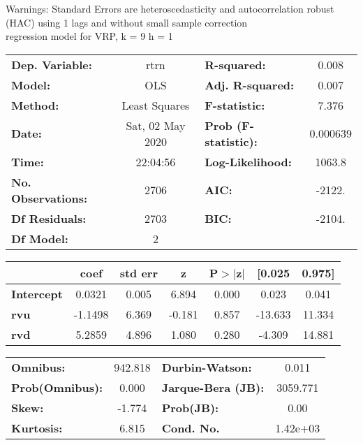 Warnings: \newline
 [1] Standard Errors are heteroscedasticity and autocorrelation robust (HAC) using 1 lags and without small sample correction\\ 

regression model for VRP, k = 9 h = 1\begin{center}
\begin{tabular}{lclc}
\toprule
\textbf{Dep. Variable:}    &       rtrn       & \textbf{  R-squared:         } &     0.008   \\
\textbf{Model:}            &       OLS        & \textbf{  Adj. R-squared:    } &     0.007   \\
\textbf{Method:}           &  Least Squares   & \textbf{  F-statistic:       } &     7.376   \\
\textbf{Date:}             & Sat, 02 May 2020 & \textbf{  Prob (F-statistic):} &  0.000639   \\
\textbf{Time:}             &     22:04:56     & \textbf{  Log-Likelihood:    } &    1063.8   \\
\textbf{No. Observations:} &        2706      & \textbf{  AIC:               } &    -2122.   \\
\textbf{Df Residuals:}     &        2703      & \textbf{  BIC:               } &    -2104.   \\
\textbf{Df Model:}         &           2      & \textbf{                     } &             \\
\bottomrule
\end{tabular}
\begin{tabular}{lcccccc}
                   & \textbf{coef} & \textbf{std err} & \textbf{z} & \textbf{P$> |$z$|$} & \textbf{[0.025} & \textbf{0.975]}  \\
\midrule
\textbf{Intercept} &       0.0321  &        0.005     &     6.894  &         0.000        &        0.023    &        0.041     \\
\textbf{rvu}       &      -1.1498  &        6.369     &    -0.181  &         0.857        &      -13.633    &       11.334     \\
\textbf{rvd}       &       5.2859  &        4.896     &     1.080  &         0.280        &       -4.309    &       14.881     \\
\bottomrule
\end{tabular}
\begin{tabular}{lclc}
\textbf{Omnibus:}       & 942.818 & \textbf{  Durbin-Watson:     } &    0.011  \\
\textbf{Prob(Omnibus):} &   0.000 & \textbf{  Jarque-Bera (JB):  } & 3059.771  \\
\textbf{Skew:}          &  -1.774 & \textbf{  Prob(JB):          } &     0.00  \\
\textbf{Kurtosis:}      &   6.815 & \textbf{  Cond. No.          } & 1.42e+03  \\
\bottomrule
\end{tabular}
\end{center}

